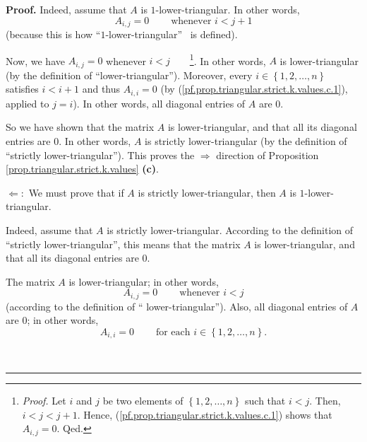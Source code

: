 \documentclass[numbers=enddot,12pt,final,onecolumn,notitlepage]{scrartcl}%
\theoremstyle{definition}
\newenvironment{proof}[1][Proof]{\noindent\textbf{#1.} }{\ \rule{0.5em}{0.5em}}
\begin{document}
\begin{proof}
Indeed, assume that $A$ is $1$-lower-triangular. In other words,%
\begin{equation}
A_{i,j}=0\ \ \ \ \ \ \ \ \ \ \text{whenever }i<j+1
\label{pf.prop.triangular.strict.k.values.c.1}%
\end{equation}
(because this is how \textquotedblleft$1$-lower-triangular\textquotedblright%
\ is defined).

Now, we have $A_{i,j}=0$ whenever $i<j$\ \ \ \ \footnote{\textit{Proof.} Let
$i$ and $j$ be two elements of $\left\{  1,2,\ldots,n\right\}  $ such that
$i<j$. Then, $i<j<j+1$. Hence, (\ref{pf.prop.triangular.strict.k.values.c.1})
shows that $A_{i,j}=0$. Qed.}. In other words, $A$ is lower-triangular (by the
definition of \textquotedblleft lower-triangular\textquotedblright). Moreover,
every $i\in\left\{  1,2,\ldots,n\right\}  $ satisfies $i<i+1$ and thus
$A_{i,i}=0$ (by (\ref{pf.prop.triangular.strict.k.values.c.1}), applied to
$j=i$). In other words, all diagonal entries of $A$ are $0$.

So we have shown that the matrix $A$ is lower-triangular, and that all its
diagonal entries are $0$. In other words, $A$ is strictly lower-triangular (by
the definition of \textquotedblleft strictly
lower-triangular\textquotedblright). This proves the $\Longrightarrow$
direction of Proposition \ref{prop.triangular.strict.k.values} \textbf{(c)}.

$\Longleftarrow:$ We must prove that if $A$ is strictly lower-triangular, then
$A$ is $1$-lower-triangular.

Indeed, assume that $A$ is strictly lower-triangular. According to the
definition of \textquotedblleft strictly lower-triangular\textquotedblright,
this means that the matrix $A$ is lower-triangular, and that all its diagonal
entries are $0$.

The matrix $A$ is lower-triangular; in other words,%
\begin{equation}
A_{i,j}=0\ \ \ \ \ \ \ \ \ \ \text{whenever }i<j
\label{pf.prop.triangular.strict.k.values.c.6}%
\end{equation}
(according to the definition of \textquotedblleft
lower-triangular\textquotedblright). Also, all diagonal entries of $A$ are
$0$; in other words,%
\begin{equation}
A_{i,i}=0\ \ \ \ \ \ \ \ \ \ \text{for each }i\in\left\{  1,2,\ldots
,n\right\}  . \label{pf.prop.triangular.strict.k.values.c.7}%
\end{equation}



\end{proof}
\end{document}
